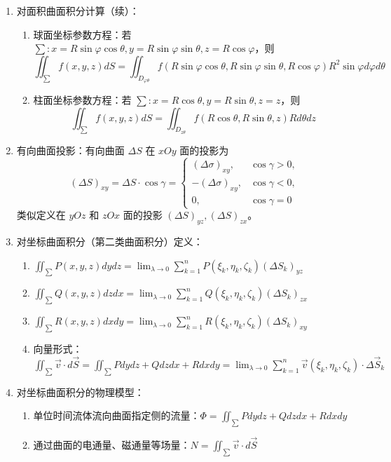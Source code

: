 \documentclass[UTF8]{ctexart}
\theoremstyle{remark}
\begin{document}
\begin{enumerate}
\begin{enumerate}
		\end{enumerate}
		\item 对面积曲面积分计算（续）：
		\begin{enumerate}
			\item 球面坐标参数方程：若 \(\sum: x = R\sin\varphi\cos\theta, y = R\sin\varphi\sin\theta, z = R\cos\varphi\)，则 
			\[
			\iint_{\sum} f(x, y, z)dS = \iint_{D_{\varphi\theta}} f(R\sin\varphi\cos\theta, R\sin\varphi\sin\theta, R\cos\varphi)R^2\sin\varphi d\varphi d\theta
			\]
			\item 柱面坐标参数方程：若 \(\sum: x = R\cos\theta, y = R\sin\theta, z = z\)，则 
			\[
			\iint_{\sum} f(x, y, z)dS = \iint_{D_{z\theta}} f(R\cos\theta, R\sin\theta, z)R d\theta dz
			\]
		\end{enumerate}
		
		\item 有向曲面投影：有向曲面 \(\Delta S\) 在 \(xOy\) 面的投影为 
		\[
		(\Delta S)_{xy} = \Delta S \cdot \cos\gamma = 
		\begin{cases} 
			(\Delta\sigma)_{xy}, & \cos\gamma > 0, \\
			-(\Delta\sigma)_{xy}, & \cos\gamma < 0, \\
			0, & \cos\gamma = 0 
		\end{cases}
		\]
		类似定义在 \(yOz\) 和 \(zOx\) 面的投影 \( (\Delta S)_{yz}, (\Delta S)_{zx} \)。
		
		\item 对坐标曲面积分（第二类曲面积分）定义：
		\begin{enumerate}
			\item \(\iint_{\sum} P(x, y, z)dydz = \lim_{\lambda\to0} \sum_{k=1}^n P(\xi_k, \eta_k, \zeta_k)(\Delta S_k)_{yz}\)
			\item \(\iint_{\sum} Q(x, y, z)dzdx = \lim_{\lambda\to0} \sum_{k=1}^n Q(\xi_k, \eta_k, \zeta_k)(\Delta S_k)_{zx}\)
			\item \(\iint_{\sum} R(x, y, z)dxdy = \lim_{\lambda\to0} \sum_{k=1}^n R(\xi_k, \eta_k, \zeta_k)(\Delta S_k)_{xy}\)
			\item 向量形式：\(\iint_{\sum} \vec{v}\cdot d\vec{S} = \iint_{\sum} P dydz + Q dzdx + R dxdy = \lim_{\lambda\to0} \sum_{k=1}^n \vec{v}(\xi_k, \eta_k, \zeta_k)\cdot\Delta\vec{S}_k\)
		\end{enumerate}
		
		\item 对坐标曲面积分的物理模型：
		\begin{enumerate}
			\item 单位时间流体流向曲面指定侧的流量：\(\Phi = \iint_{\sum} P dydz + Q dzdx + R dxdy\)
			\item 通过曲面的电通量、磁通量等场量：\(N = \iint_{\sum} \vec{v}\cdot d\vec{S}\)
		\end{enumerate}
		

\end{enumerate}
\end{document}
